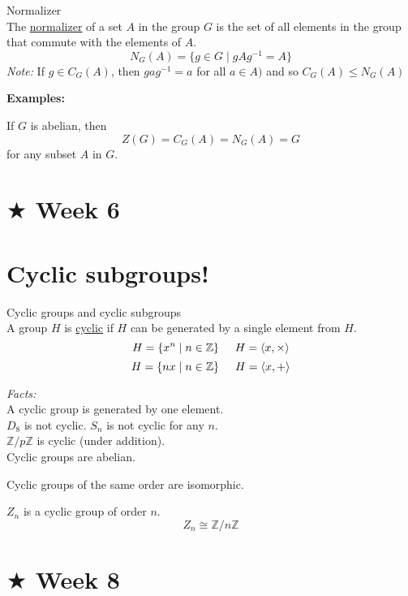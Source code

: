 \documentclass{article}
\begin{document}
\vspace{0.5cm}
 Normalizer\\
The \underline{normalizer} of a set \(A\) in the group \(G\) is the set of all elements in the group that commute with the elements of \(A\).
\[N_G(A)=\{g \in G \mid gAg^{-1}=A\}\]
\textit{Note:} If \(g \in C_G(A)\), then \(gag^{-1}=a\) for all \(a \in A)\) and so \(C_G(A) \leq N_G(A)\)
    
    \vspace{0.5cm}
    \centerline{\textbf{Examples:}}
    \begin{adjustwidth}{40pt}{40pt}
        If \(G\) is abelian, then
        \[Z(G)=C_G(A)=N_G(A)=G\]
        for any subset \(A\) in \(G\).
    \end{adjustwidth}


\newpage
\section*{$\bigstar$ Week 6}
\section*{Cyclic subgroups!}
\vspace{0.5cm}
 Cyclic groups and cyclic subgroups\\
A group \(H\) is \underline{cyclic} if \(H\) can be generated by a single element from \(H\).
\[H=\{x^n \mid n \in \mathbb{Z}\} \hspace{0.5cm} H=\langle x, \times \rangle\]
\[H=\{ nx \mid n \in \mathbb{Z} \} \hspace{0.5cm} H=\langle x, + \rangle\]

\textit{Facts:}\\
A cyclic group is generated by one element.\\
\(D_8\) is not cyclic. \(S_n\) is not cyclic for any \(n\).\\
\(\mathbb{Z}/p\mathbb{Z}\) is cyclic (under addition).\\
Cyclic groups are abelian.

\vspace{0.5cm}
Cyclic groups of the same order are isomorphic.

\vspace{0.5cm}
 \(Z_n\) is a cyclic group of order \(n\).
\[Z_n \cong \mathbb{Z}/n \mathbb{Z}\]

\newpage
\section*{$\bigstar$ Week 8}
\end{document}
